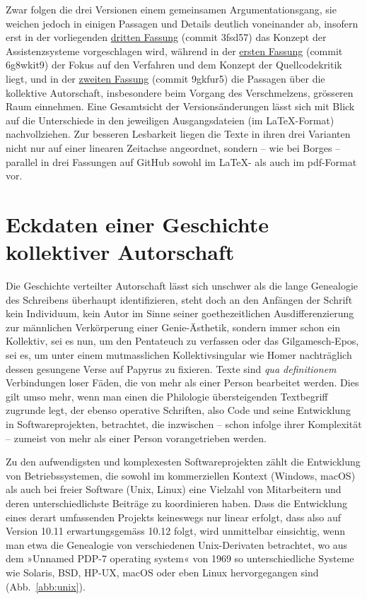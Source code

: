 \documentclass[a4paper,10pt]{article}
\newcommand{\anf}[1]{»#1«}
\begin{document}
Zwar folgen die drei Versionen einem gemeinsamen Argumentationsgang, sie weichen jedoch in einigen Passagen und Details deutlich voneinander ab, insofern erst in der vorliegenden \href{https://github.com/nachsommer/VersionsKontrolle/tree/master/3.Fassung}{dritten Fassung} (commit 3fsd57) das Konzept der Assistenzsysteme vorgeschlagen wird, während in der \href{https://github.com/nachsommer/VersionsKontrolle/tree/master/1.Fassung}{ersten Fassung} (commit 6g8wkit9) der Fokus auf den Verfahren und dem Konzept der Quellcodekritik liegt, und in der \href{https://github.com/nachsommer/VersionsKontrolle/tree/master/2.Fassung}{zweiten Fassung} (commit 9gkfur5) die Passagen über die kollektive Autorschaft, insbesondere beim Vorgang des Verschmelzens, grösseren Raum einnehmen. Eine Gesamtsicht der Versionsänderungen lässt sich mit Blick auf die Unterschiede in den jeweiligen Ausgangsdateien (im \LaTeX-Format) nachvollziehen. Zur besseren Lesbarkeit liegen die Texte in ihren drei Varianten nicht nur auf einer linearen Zeitachse angeordnet, sondern – wie bei Borges – parallel in drei Fassungen auf GitHub sowohl im \LaTeX- als auch im pdf-Format vor.


\section[Eckdaten einer Geschichte kollektiver Autorschaft]{Eckdaten einer Geschichte\\ 
kollektiver Autorschaft}

\noindent Die Geschichte verteilter Autorschaft lässt sich unschwer als die lange Genealogie des Schreibens überhaupt identifizieren, steht doch an den Anfängen der Schrift kein Individuum, kein Autor im Sinne seiner goethezeitlichen Ausdifferenzierung zur männlichen Verkörperung einer Genie-Ästhetik, sondern immer schon ein Kollektiv, sei es nun, um den Pentateuch zu verfassen oder das Gilgamesch-Epos, sei es, um unter einem mut\-mass\-lichen Kollektivsingular wie Homer nachträglich dessen gesungene Verse auf Papyrus zu fixieren. Texte sind \emph{qua definitionem} Verbindungen loser Fäden, die von mehr als einer Person bearbeitet werden. Dies gilt umso mehr, wenn man einen die Philologie übersteigenden Textbegriff zugrunde legt, der ebenso operative Schriften, also Code und seine Entwicklung in Softwareprojekten, betrachtet, die inzwischen – schon infolge ihrer Komplexität – zumeist von mehr als einer Person vorangetrieben werden. 

Zu den aufwendigsten und komplexesten Softwareprojekten zählt die Entwicklung von Betriebssystemen, die sowohl im kommerziellen Kontext (Windows, macOS) als auch bei freier Software (Unix, Linux) eine Vielzahl von Mitarbeitern und deren unterschiedlichste Beiträge zu koordinieren haben. Dass die Entwicklung eines derart umfassenden Projekts keineswegs nur linear erfolgt, dass also auf Version 10.11 erwartungsgemäss 10.12 folgt, wird unmittelbar einsichtig, wenn man etwa die Genealogie von verschiedenen Unix-Derivaten betrachtet, wo aus dem \anf{Unnamed PDP-7 operating system} von 1969 so unterschiedliche Systeme wie Solaris, BSD, HP-UX, macOS oder eben Linux hervorgegangen sind (Abb.~\ref{abb:unix}).
\end{document}
